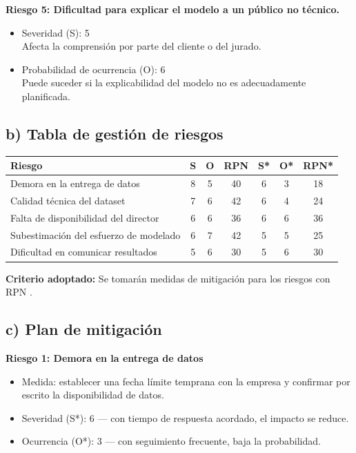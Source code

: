 \documentclass[
11pt, %
]{charter}
\begin{document}
\textbf{Riesgo 5: Dificultad para explicar el modelo a un público no técnico.}
\begin{itemize}
  \item Severidad (S): 5 \\
  Afecta la comprensión por parte del cliente o del jurado.
  \item Probabilidad de ocurrencia (O): 6 \\
  Puede suceder si la explicabilidad del modelo no es adecuadamente planificada.
\end{itemize}

\subsection*{b) Tabla de gestión de riesgos}

\begin{table}[htpb]
\centering
\begin{tabularx}{\linewidth}{@{}|X|c|c|c|c|c|c|@{}}
\hline
\rowcolor[HTML]{C0C0C0} 
Riesgo & S & O & RPN & S* & O* & RPN* \\ \hline
Demora en la entrega de datos & 8 & 5 & 40 & 6 & 3 & 18 \\ \hline
Calidad técnica del dataset & 7 & 6 & 42 & 6 & 4 & 24 \\ \hline
Falta de disponibilidad del director & 6 & 6 & 36 & 6 & 6 & 36 \\ \hline
Subestimación del esfuerzo de modelado & 6 & 7 & 42 & 5 & 5 & 25 \\ \hline
Dificultad en comunicar resultados & 5 & 6 & 30 & 5 & 6 & 30 \\ \hline
\end{tabularx}
\end{table}

\textbf{Criterio adoptado:}  
Se tomarán medidas de mitigación para los riesgos con RPN .

\subsection*{c) Plan de mitigación}

\textbf{Riesgo 1: Demora en la entrega de datos}
\begin{itemize}
  \item Medida: establecer una fecha límite temprana con la empresa y confirmar por escrito la disponibilidad de datos.
  \item Severidad (S*): 6 — con tiempo de respuesta acordado, el impacto se reduce.
  \item Ocurrencia (O*): 3 — con seguimiento frecuente, baja la probabilidad.
\end{itemize}
\end{document}
